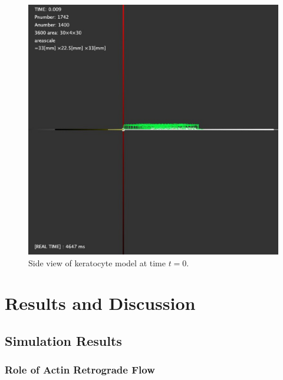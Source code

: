 \documentclass[a4paper,12pt]{book}
\begin{document}
\begin{figure}[tbp]
\centering
\includegraphics[scale=0.25]{side.eps}
\caption{Side view of keratocyte model at time $t=0$.}
\label{fig:side0}
\end{figure}

\chapter{Results and Discussion}
\section{Simulation Results}
\subsection{Role of Actin Retrograde Flow}
\end{document}
